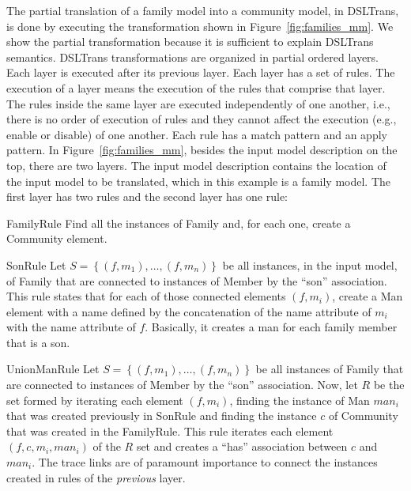The partial translation of a family model into a community model, in DSLTrans,
is done by executing the transformation shown in Figure~\ref{fig:families_mm}.
We show the partial transformation because it is sufficient to explain DSLTrans
semantics. DSLTrans transformations are organized in partial ordered layers.
Each layer is executed after its previous layer. Each layer has a set of rules.
The execution of a layer means the execution of the rules that comprise that
layer.
The rules inside the same layer are executed independently of one another, i.e.,
there is no order of execution of rules and they cannot affect the execution
(e.g., enable or disable) of one another. Each rule has a match pattern and an apply pattern.
In Figure~\ref{fig:families_mm}, besides the input model description on the top,
there are two layers. The input model description contains the location of the
input model to be translated, which in this example is a family model. The first layer has two rules and the second layer
has one rule:
\begin{compactdesc}
	\item[FamilyRule] Find all the instances of Family and, for each one, create a Community element.
	\item[SonRule] Let $S = \left\{ (f, m_1) , \ldots , (f, m_n) \right\}$ be all instances, in the input model, of Family that are connected to instances of Member by the ``son'' association. This rule states that for each of those connected elements
$(f, m_i)$, create a Man element with a name defined by the concatenation of the name attribute of $m_i$ with the name attribute of $f$. Basically, it creates a man for each family member that is a son.
	\item[UnionManRule] Let $S = \left\{ (f, m_1) , \ldots , (f, m_n) \right\}$ be all instances of Family that are connected to instances of Member by the ``son'' association. 
	Now, let $R$ be the set formed by iterating each element $(f, m_i)$, finding the instance of Man ${man}_i$ that was created previously in SonRule and finding the instance $c$ of Community that was created in the FamilyRule. This rule iterates each element $(f, c, m_i, {man}_i)$ of the $R$ set and creates a ``has'' association between $c$ and ${man}_i$. The trace links are of paramount importance to connect the instances created in rules of the \emph{previous} layer.
\end{compactdesc}

